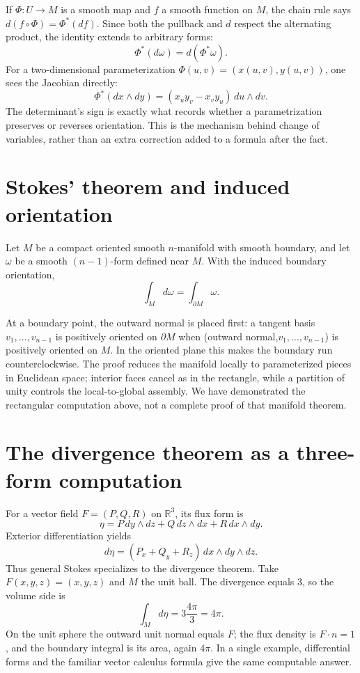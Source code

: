 If \(\Phi:U\to M\) is a smooth map and \(f\) a smooth function on \(M\), the chain rule says \(d(f\circ\Phi)=\Phi^*(df)\). Since both the pullback and \(d\) respect the alternating product, the identity extends to arbitrary forms:
\[
 \boxed{\Phi^*(d\omega)=d(\Phi^*\omega)}.
\]
For a two-dimensional parameterization \(\Phi(u,v)=(x(u,v),y(u,v))\), one sees the Jacobian directly:
\[
 \Phi^*(dx\wedge dy)=
 (x_uy_v-x_vy_u)\,du\wedge dv.
\]
The determinant's sign is exactly what records whether a parametrization preserves or reverses orientation. This is the mechanism behind change of variables, rather than an extra correction added to a formula after the fact.

\section{Stokes' theorem and induced orientation}

\begin{theorem}
Let \(M\) be a compact oriented smooth \(n\)-manifold with smooth boundary, and let \(\omega\) be a smooth \((n-1)\)-form defined near \(M\). With the induced boundary orientation,
\[
 \int_M d\omega=\int_{\partial M}\omega.
\]
\end{theorem}

At a boundary point, the outward normal is placed first: a tangent basis \(v_1,\ldots,v_{n-1}\) is positively oriented on \(\partial M\) when (outward normal,\(v_1,\ldots,v_{n-1}\)) is positively oriented on \(M\). In the oriented plane this makes the boundary run counterclockwise. The proof reduces the manifold locally to parameterized pieces in Euclidean space; interior faces cancel as in the rectangle, while a partition of unity controls the local-to-global assembly. We have demonstrated the rectangular computation above, not a complete proof of that manifold theorem.

\section{The divergence theorem as a three-form computation}

For a vector field \(F=(P,Q,R)\) on \(\mathbb R^3\), its flux form is
\[
 \eta=P\,dy\wedge dz+Q\,dz\wedge dx+R\,dx\wedge dy.
\]
Exterior differentiation yields
\[
 d\eta=(P_x+Q_y+R_z)\,dx\wedge dy\wedge dz.
\]
Thus general Stokes specializes to the divergence theorem. Take \(F(x,y,z)=(x,y,z)\) and \(M\) the unit ball. The divergence equals \(3\), so the volume side is
\[
 \int_Md\eta=3\frac{4\pi}{3}=4\pi.
\]
On the unit sphere the outward unit normal equals \(F\); the flux density is \(F\cdot n=1\), and the boundary integral is its area, again \(4\pi\). In a single example, differential forms and the familiar vector calculus formula give the same computable answer.

